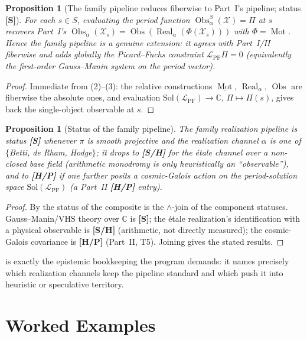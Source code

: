 \documentclass[12pt]{article}
\newtheorem{proposition}[theorem]{Proposition}
\theoremstyle{definition}
\theoremstyle{remark}
\newcommand{\Mot}{\operatorname{Mot}}
\newcommand{\Real}{\operatorname{Real}}
\newcommand{\Obs}{\operatorname{Obs}}
\newcommand{\CC}{\mathbb{C}}
\newcommand{\status}[1]{\textnormal{\textsf{\textbf{[#1]}}}}
\begin{document}
\begin{proposition}[The family pipeline reduces fiberwise to Part~I's pipeline; status \status{S}]
\label{prop:reduce}
For each $s\in S$, evaluating the period function $\Obs_\alpha^S(\mathcal X)=\Pi$ at $s$ recovers Part~I's
$\Obs_\alpha(\mathcal X_s) = \Obs(\Real_\alpha(\Phi(\mathcal X_s)))$ with $\Phi=\Mot$. Hence the family
pipeline is a genuine extension: it agrees with Part~I/II fiberwise and adds globally the Picard--Fuchs
constraint $\mathcal L_{\mathrm{PF}}\Pi=0$ (equivalently the first-order Gauss--Manin system on the period
vector).
\end{proposition}
\begin{proof}
Immediate from (2)--(3): the relative constructions $\underline{\Mot}$, $\Real_\alpha$,
$\Obs$ are fiberwise the absolute ones, and evaluation
$\mathrm{Sol}(\mathcal L_{\mathrm{PF}})\to \CC$, $\Pi\mapsto\Pi(s)$, gives back the single-object
observable at $s$.
\end{proof}

\begin{proposition}[Status of the family pipeline]
\label{prop:familystatus}
The family realization pipeline is status \status{S} whenever $\pi$ is smooth projective and the
realization channel $\alpha$ is one of $\{$Betti, de Rham, Hodge$\}$; it drops to \status{S/H} for the
\'etale channel over a non-closed base field (arithmetic monodromy is only heuristically an
``observable''), and to \status{H/P} if one further posits a cosmic-Galois action on the period-solution
space $\mathrm{Sol}(\mathcal L_{\mathrm{PF}})$ (a Part~II \status{H/P} entry).
\end{proposition}
\begin{proof}
By  the status of the composite is the $\wedge$-join of the component statuses.
Gauss--Manin/VHS theory over $\CC$ is \status{S}; the \'etale realization's identification with a
physical observable is \status{S/H} (arithmetic, not directly measured); the cosmic-Galois covariance is
\status{H/P} (Part~II, T5). Joining gives the stated results.
\end{proof}

 is exactly the epistemic bookkeeping the program demands: it names precisely
which realization channels keep the pipeline standard and which push it into heuristic or speculative
territory.

\section{Worked Examples}
\label{sec:examples}
\end{document}
